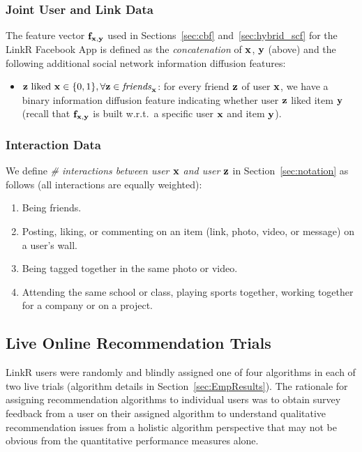 \subsubsection{Joint User and Link Data}

\label{sec:fxy_def}

The feature vector $\mathbf{f}_{\mathbf{x},\mathbf{y}}$ used in Sections~\ref{sec:cbf}
and~\ref{sec:hybrid_scf} for the LinkR Facebook App is defined as the
\emph{concatenation} of $\mathbf{x}$, $\mathbf{y}$ (above) and the following
additional social network information diffusion features:
\begin{itemize}
\item $\mbox{$\mathbf{z}$ liked $\mathbf{x}$} \in \{0, 1\}, \forall \mathbf{z} \in \mathit{friends}_{\mathbf{x}}$: for every friend $\mathbf{z}$ of user $\mathbf{x}$, we have a binary information diffusion  feature indicating whether user $\mathbf{z}$ liked item $\mathbf{y}$ (recall that $\mathbf{f}_{\mathbf{x},\mathbf{y}}$ is built w.r.t.\ a specific user $\mathbf{x}$ and item $\mathbf{y}$).
\end{itemize}

\subsubsection{Interaction Data}
\label{sec:interactions}

We define \emph{\# interactions between user $\mathbf{x}$ and user $\mathbf{z}$} in 
Section~\ref{sec:notation} as follows (all interactions are equally weighted):
\begin{enumerate}
\item{Being friends.}
\item{Posting, liking, or commenting on an item (link, photo, video, or message) on a user's wall.}
\item{Being tagged together in the same photo or video.}
\item{Attending the same school or class, playing sports together, working together for a company or on a project.}
\end{enumerate}

\subsection{Live Online Recommendation Trials}

LinkR users were randomly and blindly assigned one of four algorithms
in each of two live trials (algorithm details in
Section~\ref{sec:EmpResults}).  The rationale for assigning
recommendation algorithms to individual users was to obtain survey
feedback from a user on their assigned algorithm to understand
qualitative recommendation issues from a holistic algorithm
perspective that may not be obvious from the quantitative performance
measures alone.


